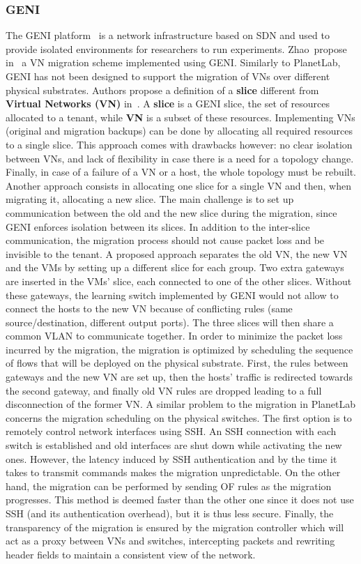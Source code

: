 \subsubsection{GENI}
The GENI platform~\cite{GENI-Berman2014} is a network infrastructure based on SDN and used to provide isolated environments for researchers to run experiments.
Zhao~\etal propose in~\cite{Zhao2017} a VN migration scheme implemented using GENI. 
Similarly to PlanetLab, GENI has not been designed to support the migration of VNs over different physical substrates. 
Authors propose a definition of a \textbf{slice} different from \textbf{Virtual Networks (VN)} in~\cite{Zhao2017}.
A \textbf{slice} is a GENI slice, \ie the set of resources allocated to a tenant, while \textbf{VN} is a subset of these resources.
Implementing VNs (original and migration backups) can be done by allocating all required resources to a single slice. This approach comes with drawbacks however: no clear isolation between VNs, and lack of flexibility in case there is a need for a topology change. Finally, in case of a failure of a VN or a host, the whole topology must be rebuilt.
Another approach consists in allocating one slice for a single VN and then, when migrating it, allocating a new slice. The main challenge is to set up communication between the old and the new slice during the migration, since GENI enforces isolation between its slices.
In addition to the inter-slice communication, the migration process should not cause packet loss and be invisible to the tenant.
A proposed approach separates the old VN, the new VN and the VMs by setting up a different slice for each group. Two extra gateways are inserted in the VMs' slice, each connected to one of the other slices.
Without these gateways, the learning switch implemented by GENI would not allow to connect the hosts to the new VN because of conflicting rules (same source/destination, different output ports).
The three slices will then share a common VLAN to communicate together.
In order to minimize the packet loss incurred by the migration, the migration is optimized by scheduling the sequence of flows that will be deployed on the physical substrate.
First, the rules between gateways and the new VN are set up, then the hosts' traffic is redirected towards the second gateway, and finally old VN rules are dropped leading to a full disconnection of the former VN.
A similar problem to the migration in PlanetLab concerns the migration scheduling on the physical switches.
The first option is to remotely control network interfaces using SSH.
An SSH connection with each switch is established and old interfaces are shut down while activating the new ones.
However, the latency induced by SSH authentication and by the time it takes to transmit commands makes the migration unpredictable.
On the other hand, the migration can be performed by sending OF rules as the migration progresses. This method is deemed faster than the other one since it does not use SSH (and its authentication overhead), but it is thus less secure.
Finally, the transparency of the migration is ensured by the migration controller which will act as a proxy between VNs and switches, intercepting packets and rewriting header fields to maintain a consistent view of the network.

